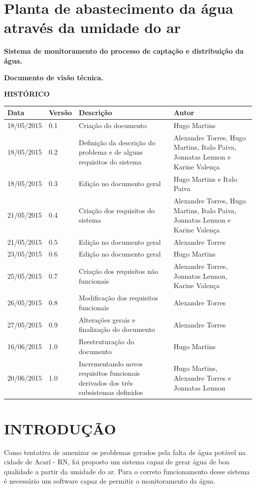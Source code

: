  \section*{Planta de abastecimento da água através da umidade do ar}
 \centerline{ \textbf{Sistema de monitoramento do processo de captação e distribuição da água.}}
 \centerline{\textbf{Documento de visão técnica.}}

 
 \textbf{HISTÓRICO}
 \begin{longtable}{|m{2.8cm}|m{1.5cm}|m{4.2cm}|m{3.5cm}|}
  \hline
\textbf{Data} & \textbf{Versão} & \textbf{Descrição} & \textbf{Autor}\\
  
  \hline
  18/05/2015 & 0.1 & Criação do documento & Hugo Martins\\
  \hline
  18/05/2015 & 0.2 & Definição da descrição do problema e de alguns requisitos do sistema & Alexandre Torres,  Hugo Martins, Italo Paiva, Jonnatas Lennon e Karine Valença\\
  \hline
  18/05/2015 & 0.3 & Edição no documento geral & Hugo Martins e Italo Paiva\\
  \hline
  21/05/2015 & 0.4 & Criação dos requisitos do sistema & Alexandre Torres, Hugo Martins, Italo Paiva, Jonnatas Lennon e Karine Valença\\
  \hline
  21/05/2015 & 0.5 & Edição no documento geral & Alexandre Torres\\
  \hline
  23/05/2015 & 0.6 & Edição no documento geral & Hugo Martins\\
  \hline
  25/05/2015 & 0.7 & Criação dos requisitos não funcionais & Alexandre Torres,  Jonnatas Lennon, Karine Valença\\
  \hline
  26/05/2015 & 0.8 & Modificação dos requisitos funcionais & Alexandre Torres\\
  \hline
  27/05/2015 & 0.9 & Alterações gerais  e finalização do documento & Alexandre Torres\\
  \hline
  16/06/2015 & 1.0 & Reestruturação do documento & Hugo Martins\\
    \hline
  20/06/2015 & 1.0 & Incrementando novos requisitos funcionais derivados dos três subsistemas definidos & Hugo Martins, Alexandre Torres e Jonnatas Lennon\\
  \hline
 \end{longtable}
 
  \section*{INTRODUÇÃO}
  Como tentativa de amenizar os problemas gerados pela falta de água potável na cidade de Acarí - RN, foi proposto um sistema 
  capaz de gerar água de boa qualidade a partir da umidade do ar. Para o correto funcionamento desse sistema é necessário um 
  software capaz de permitir o monitoramento da água.
  

